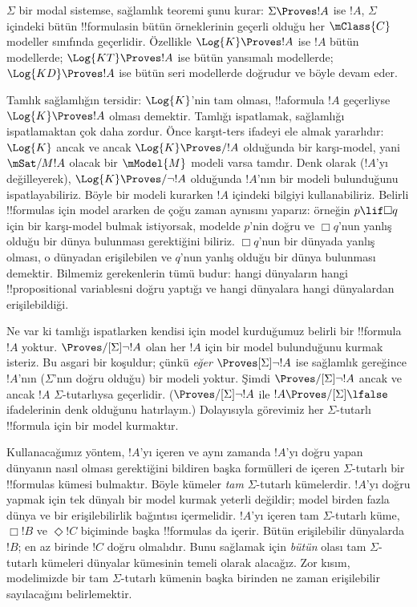 



$\Sigma$ bir modal sistemse, sağlamlık teoremi şunu kurar: $\Sigma\Proves !A$
ise $!A$, $\Sigma$ içindeki bütün !!{formula}s{}in bütün örneklerinin geçerli
olduğu her $\mClass{C}$ modeller sınıfında geçerlidir. Özellikle
$\Log{K}\Proves !A$ ise $!A$ bütün modellerde; $\Log{KT}\Proves !A$ ise
bütün yansımalı modellerde; $\Log{KD}\Proves !A$ ise bütün seri modellerde
doğrudur ve böyle devam eder.

Tamlık sağlamlığın tersidir: $\Log{K}$'nin tam olması, !!a{formula} $!A$
geçerliyse $\Log{K}\Proves !A$ olması demektir. Tamlığı ispatlamak,
sağlamlığı ispatlamaktan çok daha zordur. Önce karşıt-ters ifadeyi ele almak
yararlıdır: $\Log{K}$ ancak ve ancak $\Log{K}\Proves/ !A$ olduğunda bir
karşı-model, yani $\mSat/{M}{!A}$ olacak bir $\mModel{M}$ modeli varsa
tamdır. Denk olarak ($!A$'yı değilleyerek), $\Log{K}\Proves/\lnot !A$
olduğunda $!A$'nın bir modeli bulunduğunu ispatlayabiliriz. Böyle bir modeli
kurarken $!A$ içindeki bilgiyi kullanabiliriz. Belirli !!{formula}s için
model ararken de çoğu zaman aynısını yaparız: örneğin $p\lif\Box q$ için bir
karşı-model bulmak istiyorsak, modelde $p$'nin doğru ve $\Box q$'nun yanlış
olduğu bir dünya bulunması gerektiğini biliriz. $\Box q$'nun bir dünyada
yanlış olması, o dünyadan erişilebilen ve $q$'nun yanlış olduğu bir dünya
bulunması demektir. Bilmemiz gerekenlerin tümü budur: hangi dünyaların hangi
!!{propositional variable}s{}ni doğru yaptığı ve hangi dünyalara hangi
dünyalardan erişilebildiği.

Ne var ki tamlığı ispatlarken kendisi için model kurduğumuz belirli bir
!!{formula} $!A$ yoktur. $\Proves/[\Sigma]\lnot !A$ olan her $!A$ için bir
model bulunduğunu kurmak isteriz. Bu asgari bir koşuldur; çünkü
\emph{eğer} $\Proves[\Sigma]\lnot !A$ ise sağlamlık gereğince $!A$'nın
($\Sigma$'nın doğru olduğu) bir modeli yoktur. Şimdi
$\Proves/[\Sigma]\lnot !A$ ancak ve ancak $!A$ $\Sigma$-tutarlıysa
geçerlidir. ($\Proves/[\Sigma]\lnot !A$ ile
$!A\Proves/[\Sigma]\lfalse$ ifadelerinin denk olduğunu hatırlayın.)
Dolayısıyla görevimiz her $\Sigma$-tutarlı !!{formula} için bir model
kurmaktır.

Kullanacağımız yöntem, $!A$'yı içeren ve aynı zamanda $!A$'yı doğru yapan
dünyanın nasıl olması gerektiğini bildiren başka formülleri de içeren
$\Sigma$-tutarlı bir !!{formula}s kümesi bulmaktır. Böyle kümeler
\emph{tam} $\Sigma$-tutarlı kümelerdir. $!A$'yı doğru yapmak için tek
dünyalı bir model kurmak yeterli değildir; model birden fazla dünya ve bir
erişilebilirlik bağıntısı içermelidir. $!A$'yı içeren tam $\Sigma$-tutarlı
küme, $\Box !B$ ve $\Diamond !C$ biçiminde başka !!{formula}s da içerir.
Bütün erişilebilir dünyalarda $!B$; en az birinde $!C$ doğru olmalıdır.
Bunu sağlamak için \emph{bütün} olası tam $\Sigma$-tutarlı kümeleri dünyalar
kümesinin temeli olarak alacağız. Zor kısım, modelimizde bir tam
$\Sigma$-tutarlı kümenin başka birinden ne zaman erişilebilir sayılacağını
belirlemektir.

